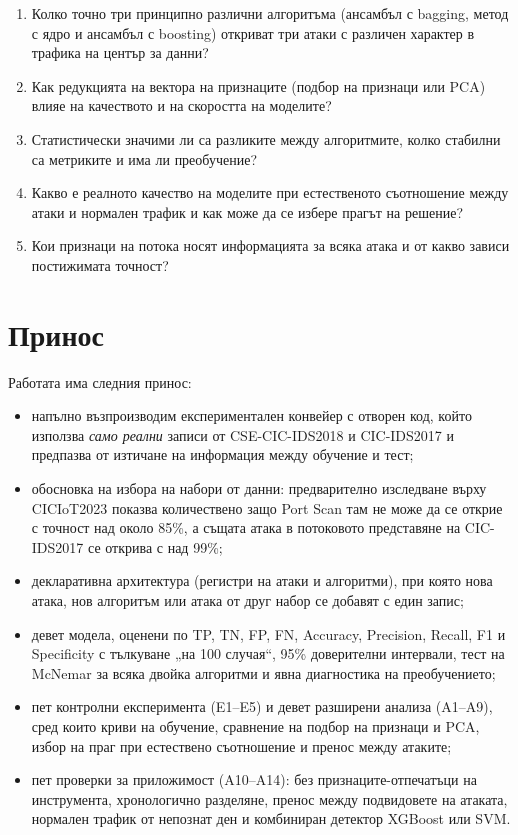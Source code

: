 \begin{enumerate}[label=\textbf{В\arabic*.},leftmargin=2.4em]
  \item Колко точно три принципно различни алгоритъма (ансамбъл с bagging, метод с ядро и ансамбъл с boosting) откриват три атаки с различен характер в трафика на център за данни?
  \item Как редукцията на вектора на признаците (подбор на признаци или PCA) влияе на качеството и на скоростта на моделите?
  \item Статистически значими ли са разликите между алгоритмите, колко стабилни са метриките и има ли преобучение?
  \item Какво е реалното качество на моделите при естественото съотношение между атаки и нормален трафик и как може да се избере прагът на решение?
  \item Кои признаци на потока носят информацията за всяка атака и от какво зависи постижимата точност?
\end{enumerate}

\section*{Принос}
Работата има следния принос:
\begin{itemize}
  \item напълно възпроизводим експериментален конвейер с отворен код, който използва \emph{само реални} записи от CSE-CIC-IDS2018 и CIC-IDS2017 и предпазва от изтичане на информация между обучение и тест;
  \item обосновка на избора на набори от данни: предварително изследване върху CICIoT2023 показва количествено защо Port Scan там не може да се открие с точност над около 85\%, а същата атака в потоковото представяне на CIC-IDS2017 се открива с над 99\%;
  \item декларативна архитектура (регистри на атаки и алгоритми), при която нова атака, нов алгоритъм или атака от друг набор се добавят с един запис;
  \item девет модела, оценени по TP, TN, FP, FN, Accuracy, Precision, Recall, F1 и Specificity с тълкуване „на 100 случая“, 95\% доверителни интервали, тест на McNemar за всяка двойка алгоритми и явна диагностика на преобучението;
  \item пет контролни експеримента (E1--E5) и девет разширени анализа (A1--A9), сред които криви на обучение, сравнение на подбор на признаци и PCA, избор на праг при естествено съотношение и пренос между атаките;
  \item пет проверки за приложимост (A10--A14): без признаците-отпечатъци на инструмента, хронологично разделяне, пренос между подвидовете на атаката, нормален трафик от непознат ден и комбиниран детектор XGBoost или SVM.
\end{itemize}

